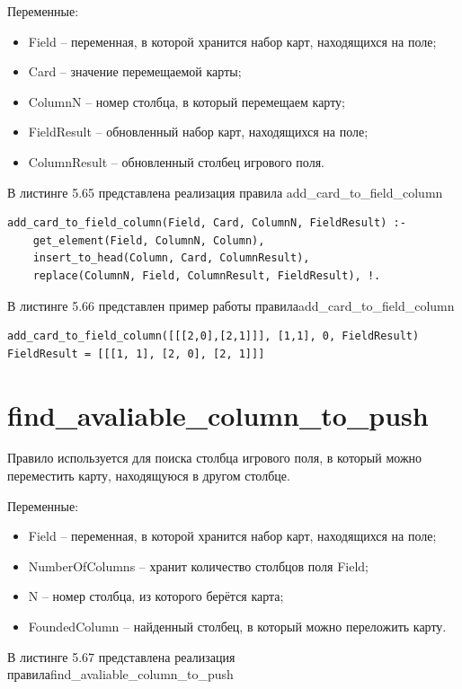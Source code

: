 \documentclass[12pt]{report}
\begin{document}
Переменные:
\begin{itemize}
\item Field – переменная, в которой хранится набор карт, находящихся на поле;
\item Card – значение перемещаемой карты;
\item ColumnN – номер столбца, в который перемещаем карту;
\item FieldResult – обновленный набор карт, находящихся на поле;
\item ColumnResult – обновленный столбец игрового поля.
\end{itemize}

В листинге 5.65 представлена реализация правила add\_card\_to\_field\_column

\begin{lstlisting}[label=some-code, caption=реализация правила add\_card\_to\_field\_column] add_card_to_field_column(Field, Card, ColumnN, FieldResult) :-
	get_element(Field, ColumnN, Column),
	insert_to_head(Column, Card, ColumnResult),
	replace(ColumnN, Field, ColumnResult, FieldResult), !.
\end{lstlisting}
В листинге 5.66 представлен пример работы правила\newline add\_card\_to\_field\_column

\begin{lstlisting}[label=some-code, caption=пример работы правила add\_card\_to\_field\_column] 
add_card_to_field_column([[[2,0],[2,1]]], [1,1], 0, FieldResult)
FieldResult = [[[1, 1], [2, 0], [2, 1]]]
\end{lstlisting}
\section{find\_avaliable\_column\_to\_push}
Правило используется для поиска столбца игрового поля, в который можно переместить карту, находящуюся в другом столбце.

Переменные:
\begin{itemize}
\item Field – переменная, в которой хранится набор карт, находящихся на поле;
\item NumberOfColumns – хранит количество столбцов поля Field;
\item N – номер столбца, из которого берётся карта;
\item FoundedColumn – найденный столбец, в который можно переложить карту.
\end{itemize}

В листинге 5.67 представлена реализация правила\newline find\_avaliable\_column\_to\_push
\end{document}
